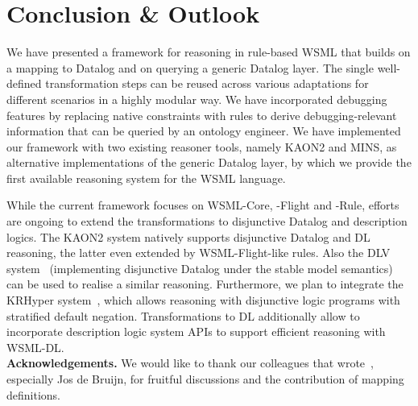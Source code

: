 \section{Conclusion \& Outlook\label{sec:outlook}}
We have presented a framework for reasoning in rule-based WSML
that builds on a mapping to Datalog and on querying a generic
Datalog layer. The single well-defined transformation steps can be
reused across various adaptations for different scenarios in a
highly modular way. We have incorporated debugging features by
replacing native constraints with rules to derive
debugging-relevant information that can be queried by an ontology
engineer. We have implemented our framework with two existing
reasoner tools, namely KAON2 and MINS, as alternative
implementations of the generic Datalog layer, by which we provide
the first available reasoning system for the WSML language.

While the current framework focuses on WSML-Core, -Flight and -Rule,
efforts are ongoing to extend the transformations to disjunctive
Datalog and description logics. The KAON2 system natively supports
disjunctive Datalog and DL reasoning, the latter even extended by
WSML-Flight-like rules. Also the DLV system~\cite{citrigno97dlv}
(implementing disjunctive Datalog under the stable model semantics)
can be used to realise a similar reasoning. Furthermore, we plan to
integrate the KRHyper system~\cite{wernhard03system}, which allows
reasoning with disjunctive logic programs with stratified default
negation. Transformations to DL additionally allow to incorporate
description logic system APIs to support efficient reasoning with
WSML-DL.\\[2mm]
{\bfseries Acknowledgements.} We would like to thank our
colleagues that wrote~\cite{wsml-spec}, especially Jos de Bruijn,
for fruitful discussions and the contribution of mapping
definitions.
